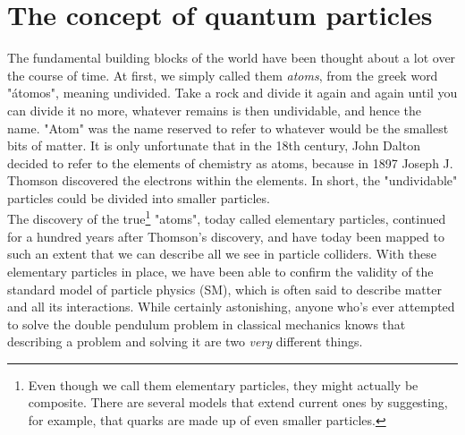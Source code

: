 \documentclass[10pt]{report}
\begin{document}
	\section{The concept of quantum particles}
	The fundamental building blocks of the world have been thought about a lot over the course of time. At first, we simply called them \emph{atoms}, from the greek word "\'{a}tomos", meaning undivided. Take a rock and divide it again and again until you can divide it no more, whatever remains is then undividable, and hence the name. "Atom" was the name reserved to refer to whatever would be the smallest bits of matter. It is only unfortunate that in the 18th century, John Dalton decided to refer to the elements of chemistry as atoms, because in 1897 Joseph J. Thomson discovered the electrons within the elements. In short, the "undividable" particles could be divided into smaller particles.\\
	The discovery of the true\footnote{Even though we call them elementary particles, they might actually be composite. There are several models that extend current ones by suggesting, for example, that quarks are made up of even smaller particles.} "atoms", today called elementary particles, continued for a hundred years after Thomson's discovery, and have today been mapped to such an extent that we can describe all we see in particle colliders. With these elementary particles in place, we have been able to confirm the validity of the standard model of particle physics (SM), which is often said to describe matter and all its interactions. While certainly astonishing, anyone who's ever attempted to solve the double pendulum problem in classical mechanics knows that describing a problem and solving it are two \emph{very} different things.\\
	
\end{document}
